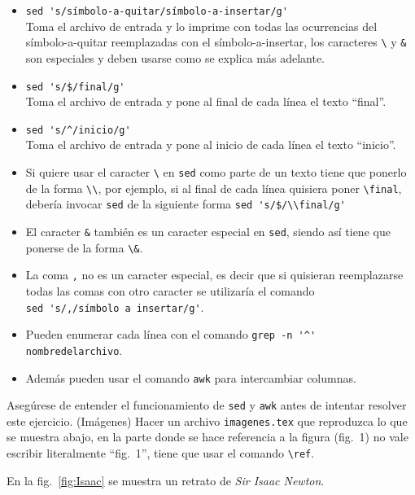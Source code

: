 \documentclass[12pt, letter]{exam}
\begin{document}
\begin{questions}
\begin{itemize}
\item \verb"sed 's/símbolo-a-quitar/símbolo-a-insertar/g'"\\
Toma el archivo de entrada y lo imprime con todas las ocurrencias del símbolo-a-quitar reemplazadas con el símbolo-a-insertar, los caracteres \verb+\+ y \verb+&+ son especiales y deben usarse como se explica más adelante.
\item \verb"sed 's/$/final/g'" \\
Toma el archivo de entrada y pone al final de cada línea el texto ``final''.
\item \verb"sed 's/^/inicio/g'" \\
Toma el archivo de entrada y pone al inicio de cada línea el texto ``inicio''.
\item Si quiere usar el caracter \verb+\+ en \verb+sed+ como parte de un texto tiene que ponerlo de la forma \verb+\\+, por ejemplo, si al final de cada línea quisiera poner \verb+\final+, debería invocar \verb+sed+ de la siguiente forma \verb+sed 's/$/\\final/g'+
\item El caracter \verb+&+ también es un caracter especial en \verb+sed+, siendo así tiene que ponerse de la forma \verb+\&+.
\item La coma \verb+,+  no es un caracter especial, es decir que si quisieran reemplazarse todas las comas con otro caracter se utilizaría el comando \\ \verb+sed 's/,/símbolo a insertar/g'+.
\item Pueden enumerar cada l\'inea con el comando \verb|grep -n '^' nombredelarchivo|.
\item Adem\'as pueden usar el comando \verb|awk| para intercambiar columnas.
\end{itemize}
Asegúrese de entender el funcionamiento de \verb+sed+ y \verb|awk| antes de intentar resolver este ejercicio.
\question {} (Imágenes) Hacer un archivo \verb"imagenes.tex" que reproduzca lo que se muestra abajo, en la parte donde se hace referencia a la figura (fig.\ 1) no vale escribir literalmente ``fig.\ 1'', tiene que usar el comando \verb+\ref+. 


\begin{mdframed}[style=mystyle]
\vspace{0.5cm}
En la fig.\ \ref{fig:Isaac} se muestra un retrato de \textit{Sir Isaac Newton}.


\end{mdframed}
\end{questions}
\end{document}
